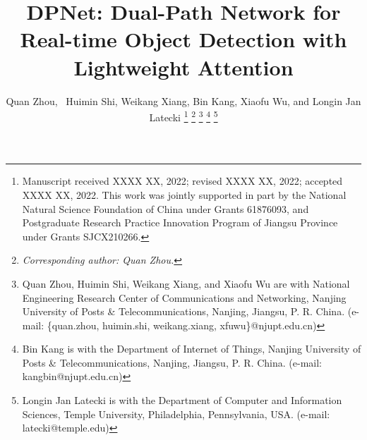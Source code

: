 \documentclass[lettersize,journal]{IEEEtran}
\begin{document}
\title{DPNet: Dual-Path Network for Real-time Object Detection with Lightweight Attention}

\author{Quan Zhou,~ Huimin Shi, Weikang Xiang, Bin Kang, Xiaofu Wu, and Longin Jan Latecki
\thanks{Manuscript received XXXX XX, 2022; revised XXXX XX, 2022; accepted XXXX XX, 2022. This work was jointly supported in part by the National Natural Science Foundation of China under Grants 61876093, and Postgraduate Research  Practice Innovation Program of Jiangsu Province under Grants SJCX210266.}
\thanks{\emph{Corresponding author: Quan Zhou.}}
\thanks{Quan Zhou, Huimin Shi, Weikang Xiang, and Xiaofu Wu are with National Engineering Research Center of Communications and Networking, Nanjing University of Posts \& Telecommunications, Nanjing, Jiangsu, P. R. China. (e-mail: \{quan.zhou, huimin.shi, weikang.xiang, xfuwu\}@njupt.edu.cn)}
\thanks{Bin Kang is with the Department of Internet of Things, Nanjing University of Posts \& Telecommunications, Nanjing, Jiangsu, P. R. China. (e-mail: kangbin@njupt.edu.cn)}
\thanks{Longin Jan Latecki is with the Department of Computer and Information Sciences, Temple University, Philadelphia, Pennsylvania, USA. (e-mail: latecki@temple.edu)}
}






\maketitle
\end{document}
